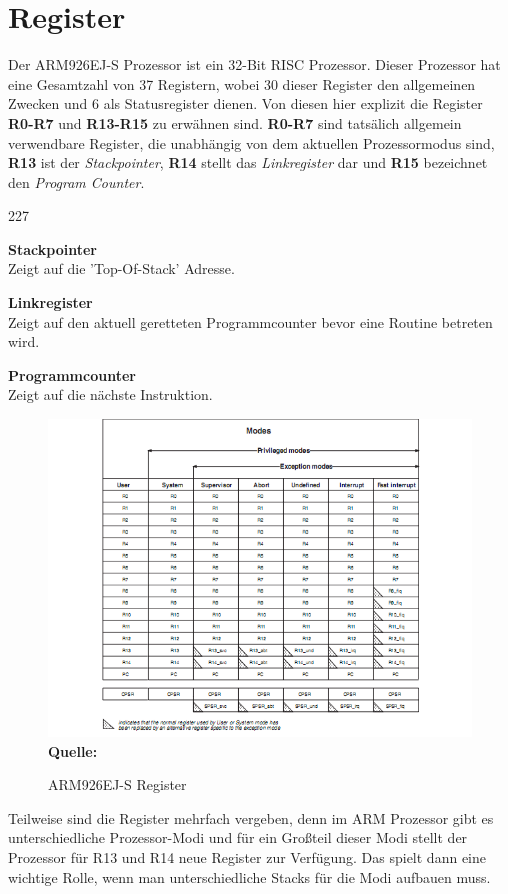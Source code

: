 \section{Register}
Der ARM926EJ-S Prozessor ist ein 32-Bit RISC Prozessor. Dieser Prozessor hat eine Gesamtzahl von 37 Registern\parencite[vgl.][44\psqq]{archManI}, wobei 30 dieser Register den allgemeinen Zwecken und 6 als Statusregister dienen. Von diesen hier explizit die Register \textbf{R0-R7} und \textbf{R13-R15} zu erw\"ahnen sind. \textbf{R0-R7} sind tats\"alich allgemein verwendbare Register, die unabh\"angig von dem aktuellen Prozessormodus sind, \textbf{R13} ist der \textit{Stackpointer}, \textbf{R14} stellt das \textit{Linkregister} dar und \textbf{R15} bezeichnet den \textit{Program Counter}.
\begin{dinglist}{227}
	\item{\textbf{Stackpointer}}\\
	Zeigt auf die 'Top-Of-Stack' Adresse.
	\item{\textbf{Linkregister}}\\
	Zeigt auf den aktuell geretteten Programmcounter bevor eine Routine betreten wird.
	\item{\textbf{Programmcounter}}\\
	Zeigt auf die n\"achste Instruktion.
\end{dinglist}
\begin{figure}[H]
\center
\includegraphics[scale=0.7]{common/register.png}\\
\footnotesize\textbf{Quelle:}\parencite[43]{archManI}
\caption{ARM926EJ-S Register}
\end{figure}
Teilweise sind die Register mehrfach vergeben, denn im ARM Prozessor gibt es unterschiedliche Prozessor-Modi und f\"ur ein Gro\ss teil dieser Modi stellt der Prozessor f\"ur R13 und R14 neue Register zur Verf\"ugung. Das spielt dann eine wichtige Rolle, wenn man unterschiedliche Stacks f\"ur die Modi aufbauen muss.
\newpage
